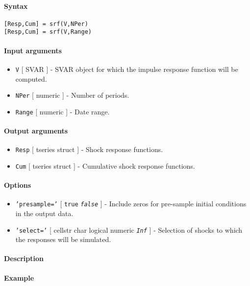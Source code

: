 


	\paragraph{Syntax}\label{syntax}

\begin{verbatim}
[Resp,Cum] = srf(V,NPer)
[Resp,Cum] = srf(V,Range)
\end{verbatim}

\paragraph{Input arguments}\label{input-arguments}

\begin{itemize}
\item
  \texttt{V} {[} SVAR {]} - SVAR object for which the impulse response
  function will be computed.
\item
  \texttt{NPer} {[} numeric {]} - Number of periods.
\item
  \texttt{Range} {[} numeric {]} - Date range.
\end{itemize}

\paragraph{Output arguments}\label{output-arguments}

\begin{itemize}
\item
  \texttt{Resp} {[} tseries \textbar{} struct {]} - Shock response
  functions.
\item
  \texttt{Cum} {[} tseries \textbar{} struct {]} - Cumulative shock
  response functions.
\end{itemize}

\paragraph{Options}\label{options}

\begin{itemize}
\item
  \texttt{'presample='} {[} \texttt{true} \textbar{}
  \emph{\texttt{false}} {]} - Include zeros for pre-sample initial
  conditions in the output data.
\item
  \texttt{'select='} {[} cellstr \textbar{} char \textbar{} logical
  \textbar{} numeric \textbar{} \emph{\texttt{Inf}} {]} - Selection of
  shocks to which the responses will be simulated.
\end{itemize}

\paragraph{Description}\label{description}

\paragraph{Example}\label{example}


